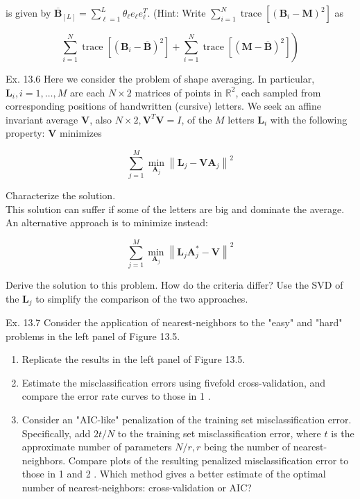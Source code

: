 \documentclass[10pt]{article}
\begin{document}
is given by $\overline{\mathbf{B}}_{[L]}=\sum_{\ell=1}^{L} \theta_{\ell} e_{\ell} e_{\ell}^{T}$. (Hint: Write $\sum_{i=1}^{N} \operatorname{trace}\left[\left(\mathbf{B}_{i}-\mathbf{M}\right)^{2}\right]$ as

$$
\left.\sum_{i=1}^{N} \operatorname{trace}\left[\left(\mathbf{B}_{i}-\overline{\mathbf{B}}\right)^{2}\right]+\sum_{i=1}^{N} \operatorname{trace}\left[(\mathbf{M}-\overline{\mathbf{B}})^{2}\right]\right)
$$

Ex. 13.6 Here we consider the problem of shape averaging. In particular, $\mathbf{L}_{i}, i=1, \ldots, M$ are each $N \times 2$ matrices of points in $\mathbb{R}^{2}$, each sampled from corresponding positions of handwritten (cursive) letters. We seek an affine invariant average $\mathbf{V}$, also $N \times 2, \mathbf{V}^{T} \mathbf{V}=I$, of the $M$ letters $\mathbf{L}_{i}$ with the following property: $\mathbf{V}$ minimizes

$$
\sum_{j=1}^{M} \min _{\mathbf{A}_{j}}\left\|\mathbf{L}_{j}-\mathbf{V A}_{j}\right\|^{2}
$$

Characterize the solution.\\
This solution can suffer if some of the letters are big and dominate the average. An alternative approach is to minimize instead:

$$
\sum_{j=1}^{M} \min _{\mathbf{A}_{j}}\left\|\mathbf{L}_{j} \mathbf{A}_{j}^{*}-\mathbf{V}\right\|^{2}
$$

Derive the solution to this problem. How do the criteria differ? Use the SVD of the $\mathbf{L}_{j}$ to simplify the comparison of the two approaches.

Ex. 13.7 Consider the application of nearest-neighbors to the "easy" and "hard" problems in the left panel of Figure 13.5.

\begin{enumerate}
  \item Replicate the results in the left panel of Figure 13.5.
  \item Estimate the misclassification errors using fivefold cross-validation, and compare the error rate curves to those in 1 .
  \item Consider an "AIC-like" penalization of the training set misclassification error. Specifically, add $2 t / N$ to the training set misclassification error, where $t$ is the approximate number of parameters $N / r, r$ being the number of nearest-neighbors. Compare plots of the resulting penalized misclassification error to those in 1 and 2 . Which method gives a better estimate of the optimal number of nearest-neighbors: cross-validation or AIC?
\end{enumerate}
\end{document}
